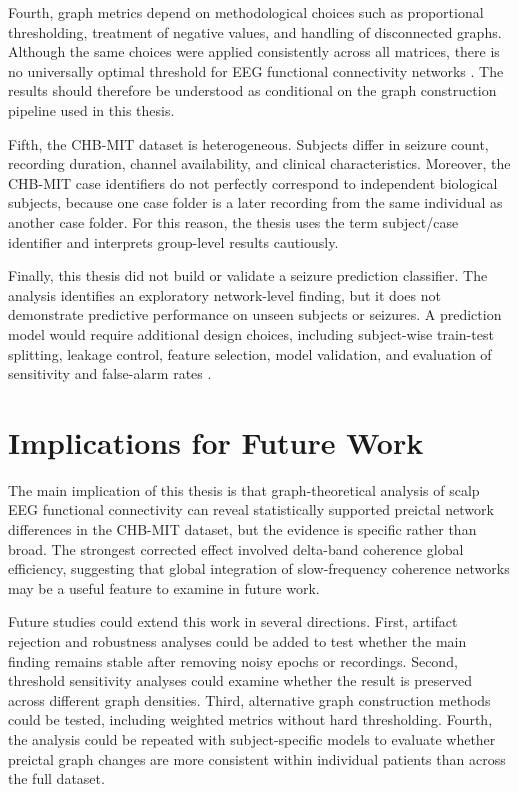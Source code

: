 Fourth, graph metrics depend on methodological choices such as proportional
thresholding, treatment of negative values, and handling of disconnected graphs.
Although the same choices were applied consistently across all matrices, there
is no universally optimal threshold for EEG functional connectivity networks
\cite{VanWijk2010,Garrison2015,Adamovich2022}. The results should therefore be
understood as conditional on the graph construction pipeline used in this
thesis.

Fifth, the CHB-MIT dataset is heterogeneous. Subjects differ in seizure count,
recording duration, channel availability, and clinical characteristics.
Moreover, the CHB-MIT case identifiers do not perfectly correspond to
independent biological subjects, because one case folder is a later recording
from the same individual as another case folder. For this reason, the thesis
uses the term subject/case identifier and interprets group-level results
cautiously.

Finally, this thesis did not build or validate a seizure prediction classifier.
The analysis identifies an exploratory network-level finding, but it does not
demonstrate predictive performance on unseen subjects or seizures. A prediction
model would require additional design choices, including subject-wise train-test
splitting, leakage control, feature selection, model validation, and evaluation
of sensitivity and false-alarm rates \cite{Mormann2007,Kuhlmann2018}.

\section{Implications for Future Work}
\label{sec:discussion-future-work}

The main implication of this thesis is that graph-theoretical analysis of scalp
EEG functional connectivity can reveal statistically supported preictal network
differences in the CHB-MIT dataset, but the evidence is specific rather than
broad. The strongest corrected effect involved delta-band coherence global
efficiency, suggesting that global integration of slow-frequency coherence
networks may be a useful feature to examine in future work.

Future studies could extend this work in several directions. First, artifact
rejection and robustness analyses could be added to test whether the main
finding remains stable after removing noisy epochs or recordings. Second,
threshold sensitivity analyses could examine whether the result is preserved
across different graph densities. Third, alternative graph construction methods
could be tested, including weighted metrics without hard thresholding. Fourth,
the analysis could be repeated with subject-specific models to evaluate whether
preictal graph changes are more consistent within individual patients than
across the full dataset.

